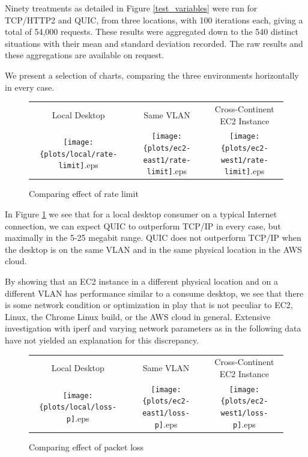 \documentclass[12pt]{article}
\begin{document}
Ninety treatments as detailed in Figure \ref{test_variables} were run for TCP/HTTP2 and QUIC, from three locations, with 100 iterations each, giving a total of 54,000 requests. These results were aggregated down to the 540 distinct situations with their mean and standard deviation recorded. The raw results and these aggregations are available on request.

We present a selection of charts, comparing the three environments horizontally in every case.

\begin{figure}[h]
\centering
\begin{tabular}{c c c}
	Local Desktop & Same VLAN & Cross-Continent EC2 Instance \\
	\texttt{[image: \{plots/local/rate-limit]}.eps} &
	\texttt{[image: \{plots/ec2-east1/rate-limit]}.eps} &
	\texttt{[image: \{plots/ec2-west1/rate-limit]}.eps} \\
\end{tabular}
\caption{Comparing effect of rate limit}
\label{figs:rate_limit}
\end{figure}

In Figure \ref{figs:rate_limit} we see that for a local desktop consumer on a typical Internet connection, we can expect QUIC to outperform TCP/IP in every case, but maximally in the 5-25 megabit range. QUIC does not outperform TCP/IP when the desktop is on the same VLAN and in the same physical location in the AWS cloud.

By showing that an EC2 instance in a different physical location and on a different VLAN has performance similar to a consume desktop, we see that there is some network condition or optimization in play that is not peculiar to EC2, Linux, the Chrome Linux build, or the AWS cloud in general. Extensive investigation with iperf and varying network parameters as in the following data have not yielded an explanation for this discrepancy.


\begin{figure}[h]
\centering
\begin{tabular}{c c c}
	Local Desktop & Same VLAN & Cross-Continent EC2 Instance \\
	\texttt{[image: \{plots/local/loss-p]}.eps} &
	\texttt{[image: \{plots/ec2-east1/loss-p]}.eps} &
	\texttt{[image: \{plots/ec2-west1/loss-p]}.eps} \\
\end{tabular}
\caption{Comparing effect of packet loss}
\label{figs:packet_loss}
\end{figure}
\end{document}
